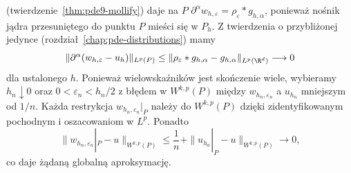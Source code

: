 (twierdzenie~\ref{thm:pde9-mollify}) daje na $P$
$\partial^\alpha w_{h,\varepsilon}
=\rho_\varepsilon*g_{h,\alpha}$, ponieważ nośnik jądra
przesuniętego do punktu $P$ mieści się w $P_h$.
Z twierdzenia o przybliżonej jedynce
(rozdział~\ref{chap:pde-distributions}) mamy
\[
 \|\partial^\alpha(w_{h,\varepsilon}-u_h)\|_{L^p(P)}
 \le \|\rho_\varepsilon*g_{h,\alpha}-g_{h,\alpha}\|_{L^p(\R^d)}
 \longrightarrow0
\]
dla ustalonego $h$. Ponieważ wielowskaźników jest
skończenie wiele, wybieramy $h_n\downarrow0$ oraz
$0<\varepsilon_n<h_n/2$ z błędem w $W^{k,p}(P)$
między $w_{h_n,\varepsilon_n}$ a $u_{h_n}$ mniejszym
od $1/n$. Każda restrykcja $w_{h_n,\varepsilon_n}|_P$
należy do $W^{k,p}(P)$ dzięki zidentyfikowanym
pochodnym i oszacowaniom w $L^p$. Ponadto
\[
 \|w_{h_n,\varepsilon_n}|_P-u\|_{W^{k,p}(P)}
 \le \frac1n+\|u_{h_n}|_P-u\|_{W^{k,p}(P)}
 \longrightarrow0,
\]
co daje żądaną globalną aproksymację.


